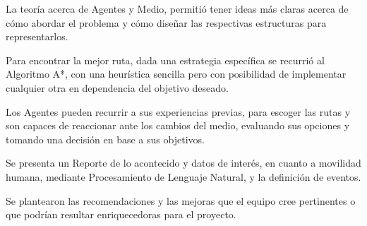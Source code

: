 \documentclass{article}
\begin{document}
La teoría acerca de Agentes y Medio, permitió tener ideas más claras acerca de cómo abordar el problema y cómo diseñar las respectivas estructuras para representarlos.

Para encontrar la mejor ruta, dada una estrategia específica se recurrió al Algoritmo A*, con una heurística sencilla pero con posibilidad de implementar cualquier otra en dependencia del objetivo deseado.

Los Agentes pueden recurrir a sus experiencias previas, para escoger las rutas y son capaces de reaccionar ante los cambios del medio, evaluando sus opciones y tomando una decisión en base a sus objetivos.

Se presenta un Reporte de lo acontecido y datos de interés, en cuanto a movilidad humana, mediante Procesamiento de Lenguaje Natural, y la definición de eventos.

Se plantearon las recomendaciones y las mejoras que el equipo cree pertinentes o que podrían resultar enriquecedoras para el proyecto.
\end{document}
